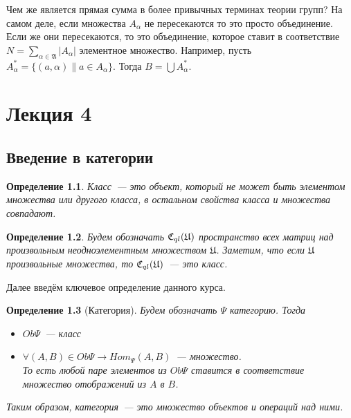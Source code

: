 \documentclass[a4paper, 12pt]{report}
\newtheorem{definition}{Определение}[chapter]
\begin{document}
Чем же является прямая сумма в более привычных терминах теории групп? На самом деле, если множества $A_{\alpha}$ не пересекаются то это просто объединение. Если же они пересекаются, то это объединение, которое ставит в соответствие $N = \sum_{\alpha\in\mathfrak{A}} |A_{\alpha}|$ элементное множество. Например, пусть $A^*_{\alpha} = \{(a, \alpha)\| a \in A_{\alpha}\}$. Тогда $B = \bigcup A^*_{\alpha}$.

\chapter{Лекция 4}
\section{Введение в категории}
\begin{definition}
Класс~--- это объект, который не может быть элементом множества или другого класса, в остальном свойства класса и множества совпадают.
\end{definition}

\begin{definition}
Будем обозначать $\mathfrak{C}_{ql}(\mathfrak{U})$ пространство всех матриц над произвольным неодноэлементным множеством $\mathfrak{U}$. Заметим, что если $\mathfrak{U}$ произвольные множества, то $\mathfrak{C}_{ql}(\mathfrak{U})$~--- это класс.
\end{definition}

Далее введём ключевое определение данного курса.

\begin{definition}[Категория]
Будем обозначать $\Psi$ категорию. Тогда
\begin{itemize}
  \item $Ob\Psi$~--- класс
  \item $\forall (A, B) \in Ob\Psi \rightarrow Hom_{\Psi} (A, B)$~--- множество. \\ То есть любой паре элементов из $Ob\Psi$ ставится в соответствие множество отображений из $A$ в $B$.
\end{itemize}
Таким образом, категория~--- это множество объектов и операций над ними.
\end{definition}
\end{document}

